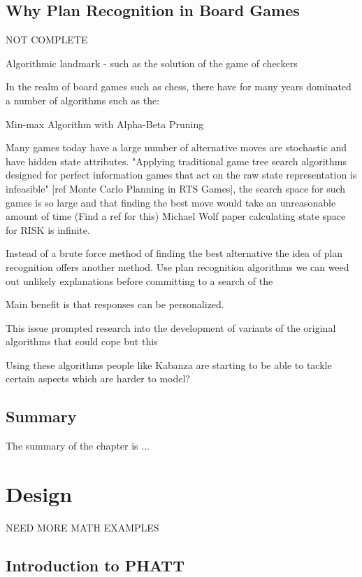 \documentclass[parskip]{cs4rep}
\begin{document}
\section{Why Plan Recognition in Board Games}

NOT COMPLETE

Algorithmic landmark - such as the solution of the game of checkers 

In the realm of board games such as chess, there have for many years dominated a number of algorithms such as the:

Min-max Algorithm with Alpha-Beta Pruning

Many games today have a large number of alternative moves are stochastic and have hidden state attributes. "Applying traditional game tree search algorithms designed for perfect information games that act on the raw state representation is infeasible" [ref Monte Carlo Planning in RTS Games], the search space for such games is so large and that finding the best move would take an unreasonable amount of time (Find a ref for this) Michael Wolf paper calculating state space for RISK is infinite.

Instead of a brute force method of finding the best alternative the idea of plan recognition offers another method. Use plan recognition algorithms we can weed out unlikely explanations before committing to a search of the 

Main benefit is that responses can be personalized.

This issue prompted research into the development of variants of the original algorithms that could cope but this 

Using these algorithms people like Kabanza are starting to be able to tackle certain aspects which are harder to model?

\section{Summary}

The summary of the chapter is ...

\chapter{Design}

NEED MORE MATH EXAMPLES

\section{Introduction to PHATT}
\end{document}
